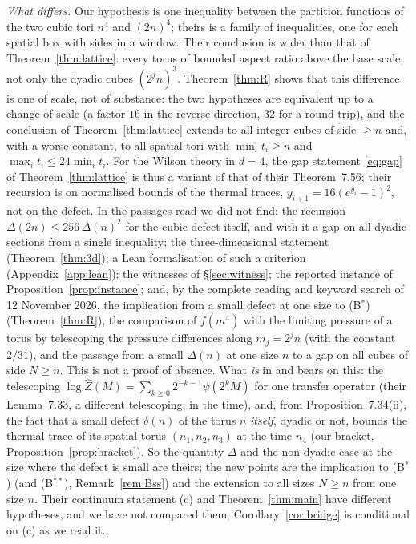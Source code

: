 \documentclass[11pt,a4paper]{article}
\theoremstyle{plain}
\theoremstyle{definition}
\theoremstyle{remark}
\numberwithin{equation}{section}
\begin{document}
\emph{What differs.} Our hypothesis is one inequality between the partition functions of the two cubic tori $n^4$ and $(2n)^4$; theirs is a
family of inequalities, one for each spatial box with sides in a window. Their conclusion is wider than that of Theorem~\ref{thm:lattice}:
every torus of bounded aspect ratio above the base scale, not only the dyadic cubes $(2^jn)^3$. Theorem~\ref{thm:R} shows that this difference is one of scale, not of substance: the two hypotheses are equivalent up to a change of scale (a factor $16$ in the reverse direction, $32$ for a round trip), and the conclusion of Theorem~\ref{thm:lattice} extends to all integer cubes of side $\ge n$ and, with a worse constant, to all spatial tori with $\min_it_i\ge n$ and $\max_it_i\le24\min_it_i$. For the Wilson theory in $d=4$, the gap
statement \eqref{eq:gap} of Theorem~\ref{thm:lattice} is thus a variant of that of their Theorem~7.56; their recursion is on normalised bounds of the thermal traces, $y_{i+1}=16(e^{y_i}-1)^2$, not on the defect. In the passages read
we did not find: the recursion $\Delta(2n)\le256\,\Delta(n)^2$ for the cubic defect itself, and with it a gap on all dyadic sections from a
single inequality; the three-dimensional statement (Theorem~\ref{thm:3d}); a Lean formalisation of such a criterion
(Appendix~\ref{app:lean}); the witnesses of \S\ref{sec:witness}; the reported instance of Proposition~\ref{prop:instance}; and, by the complete reading and keyword search of 12 November 2026, the implication from a small defect at one size to (B$^*$) (Theorem~\ref{thm:R}), the comparison of $f(m^4)$ with the limiting pressure of a torus by telescoping the pressure differences along $m_j=2^jn$ (with the constant $2/31$), and the passage from a small $\Delta(n)$ at one size $n$ to a gap on all cubes of side $N\ge n$. This is not a proof of absence. What \emph{is} in \cite{BB26v5} and bears on this: the telescoping $\log\widehat Z(M)=\sum_{k\ge0}2^{-k-1}\psi(2^kM)$ for one transfer operator (their Lemma~7.33, a different telescoping, in the time), and, from Proposition~7.34(ii), the fact that a small defect $\delta(n)$ of the torus $n$ \emph{itself}, dyadic or not, bounds the thermal trace of its spatial torus $(n_1,n_2,n_3)$ at the time $n_4$ (our bracket, Proposition~\ref{prop:bracket}). So the quantity $\Delta$ and the non-dyadic case at the size where the defect is small are theirs; the new points are the implication to (B$^*$) (and (B$^{**}$), Remark~\ref{rem:Bss}) and the extension to all sizes $N\ge n$ from one size $n$. Their continuum
statement (c) and Theorem~\ref{thm:main} have different hypotheses, and we have not compared them; Corollary~\ref{cor:bridge} is conditional on (c) as we read it.
\end{document}
